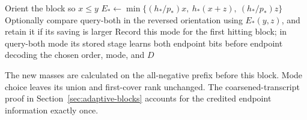 \begin{algorithm}[H]
\caption{Rational orientation and adaptive block mode}
\label{alg:block-mode}
Orient the block so $x\le y$\;
$E_*\gets\min\{(h_*/p_*)x,\ h_*(x+z),\ (h_*/p_*)z\}$\;
Optionally compare query-both in the reversed orientation using $E_*(y,z)$,
and retain it if its saving is larger\;
Record this mode for the first hitting block; in query-both mode its
stored stage learns both endpoint bits before endpoint decoding\;
\KwRet the chosen order, mode, and $D$\;
\end{algorithm}

The new masses are calculated on the all-negative prefix before this
block. Mode choice leaves its union and first-cover rank unchanged.
The coarsened-transcript proof in Section~\ref{sec:adaptive-blocks}
accounts for the credited endpoint information exactly once.
